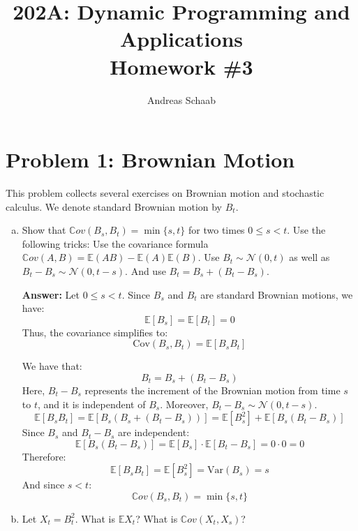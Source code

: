 \documentclass[11pt]{extarticle}
\title{202A: Dynamic Programming and Applications\\[5pt] {\Large \textbf{Homework \#3}}}
\author{Andreas Schaab}
\date{}
\theoremstyle{plain}
\theoremstyle{definition}
\begin{document}
\maketitle



\section*{Problem 1: Brownian Motion}

This problem collects several exercises on Brownian motion and stochastic calculus. We denote standard Brownian motion by $B_t$.

\begin{enumerate}[(a)]

\item Show that $\mathbb Cov(B_s, B_t) = \min\{s, t\}$ for two times $0 \leq s < t$. Use the following tricks: Use the covariance formula $\mathbb Cov(A, B) = \mathbb E (AB) - \mathbb E(A) \mathbb E(B)$. Use $B_t \sim \mathcal N(0, t)$ as well as $B_t - B_s \sim \mathcal N(0, t-s)$. And use $B_t = B_s + (B_t - B_s)$.

\textbf{Answer:} Let $0\leq s < t$. Since \( B_s \) and \( B_t \) are standard Brownian motions, we have:
\[
\mathbb{E}[B_s] = \mathbb{E}[B_t] = 0
\]
Thus, the covariance simplifies to:
\[
\text{Cov}(B_s, B_t) = \mathbb{E}[B_s B_t]
\]

We have that:
\[
B_t = B_s + (B_t - B_s)
\]
Here, \( B_t - B_s \) represents the increment of the Brownian motion from time \( s \) to \( t \), and it is independent of \( B_s \). Moreover, \( B_t - B_s \sim \mathcal{N}(0, t - s) \).
\[
\mathbb{E}[B_s B_t] = \mathbb{E}\left[ B_s \left( B_s + (B_t - B_s) \right) \right] = \mathbb{E}[B_s^2] + \mathbb{E}[B_s (B_t - B_s)]
\]
Since \( B_s \) and \( B_t - B_s \) are independent:
\[
\mathbb{E}[B_s (B_t - B_s)] = \mathbb{E}[B_s] \cdot \mathbb{E}[B_t - B_s] = 0 \cdot 0 = 0
\]
Therefore:
\[
\mathbb{E}[B_s B_t] = \mathbb{E}[B_s^2] = \text{Var}(B_s) = s
\]
And since $s<t$:
$$\mathbb Cov(B_s, B_t) = \min\{s, t\}$$

\item Let $X_t = B_t^2$. What is $\mathbb E X_t$? What is $\mathbb Cov (X_t, X_s)$?


\end{enumerate}
\end{document}
